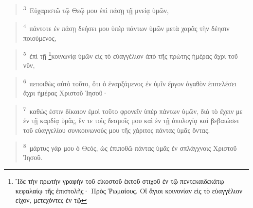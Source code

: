 \documentclass{article}
\newcommand{\currentverse}{1} %
\newcommand{\setcurrentverse}[1]{\renewcommand{\currentverse}{#1}}
\begin{document}
\begin{verse}

\setcurrentverse{3}

\setcounter{footnote}{0}

\textsuperscript{3}~Εὐχαριστῶ τῷ Θεῷ μου ἐπὶ πάσῃ τῇ μνείᾳ ὑμῶν,

\end{verse}

\begin{verse}

\setcurrentverse{4}

\setcounter{footnote}{0}

\textsuperscript{4}~πάντοτε ἐν πάσῃ δεήσει μου ὑπὲρ πάντων ὑμῶν μετὰ χαρᾶς τὴν δέησιν ποιούμενος,

\end{verse}

\begin{verse}

\setcurrentverse{5}

\setcounter{footnote}{0}

\textsuperscript{5}~ἐπὶ τῇ \footnote{Ἴδε τὴν πρωτὴν γραφήν τοῦ εἰκοστοῦ ἑκτοῦ στιχοῦ ἐν τῷ πεντεκαιδεκάτῳ κεφαλαίῳ τῆς ἐπιστολῆς· Πρὸς Ῥωμαίους. Οἵ ἅγιοι κοινονίαν εἰς τὸ εὐαγγέλιον εἰχον, μετεχόντες ἐν τῷ}κοινωνίᾳ ὑμῶν εἰς τὸ εὐαγγέλιον ἀπὸ τῆς πρώτης ἡμέρας ἄχρι τοῦ νῦν,

\end{verse}

\begin{verse}

\setcurrentverse{6}

\setcounter{footnote}{0}

\textsuperscript{6}~πεποιθὼς αὐτὸ τοῦτο, ὅτι ὁ ἐναρξάμενος ἐν ὑμῖν ἔργον ἀγαθὸν ἐπιτελέσει ἄχρι ἡμέρας Χριστοῦ Ἰησοῦ·

\end{verse}

\begin{verse}

\setcurrentverse{7}

\setcounter{footnote}{0}

\textsuperscript{7}~καθώς ἐστιν δίκαιον ἐμοὶ τοῦτο φρονεῖν ὑπὲρ πάντων ὑμῶν, διὰ τὸ ἔχειν με ἐν τῇ καρδίᾳ ὑμᾶς, ἔν τε τοῖς δεσμοῖς μου καὶ ἐν τῇ ἀπολογίᾳ καὶ βεβαιώσει τοῦ εὐαγγελίου συνκοινωνούς μου τῆς χάριτος πάντας ὑμᾶς ὄντας.

\end{verse}

\begin{verse}

\setcurrentverse{8}

\setcounter{footnote}{0}

\textsuperscript{8}~μάρτυς γάρ μου ὁ Θεός, ὡς ἐπιποθῶ πάντας ὑμᾶς ἐν σπλάγχνοις Χριστοῦ Ἰησοῦ.

\end{verse}
\end{document}
